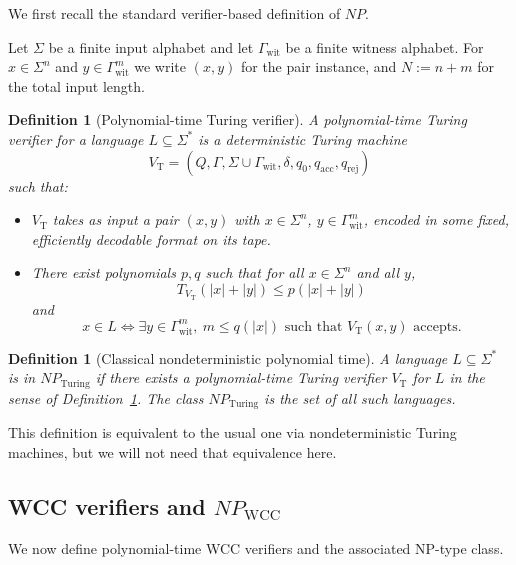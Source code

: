 \documentclass[12pt]{article}
\newtheorem{definition}[theorem]{Definition}
\begin{document}
We first recall the standard verifier-based definition of $NP$.

Let $\Sigma$ be a finite input alphabet and let $\Gamma_{\mathrm{wit}}$ be a
finite witness alphabet. For $x \in \Sigma^n$ and
$y \in \Gamma_{\mathrm{wit}}^{m}$ we write $(x,y)$ for the pair instance, and
$N := n + m$ for the total input length.

\begin{definition}[Polynomial-time Turing verifier]
\label{def:tm_verifier}
A \emph{polynomial-time Turing verifier} for a language $L \subseteq \Sigma^*$
is a deterministic Turing machine
\[
V_{\mathrm{T}} = (Q, \Gamma, \Sigma \cup \Gamma_{\mathrm{wit}}, \delta, q_0,
q_{\mathrm{acc}}, q_{\mathrm{rej}})
\]
such that:
\begin{itemize}
  \item $V_{\mathrm{T}}$ takes as input a pair $(x,y)$ with $x \in \Sigma^n$,
    $y \in \Gamma_{\mathrm{wit}}^{m}$, encoded in some fixed, efficiently
    decodable format on its tape.
  \item There exist polynomials $p,q$ such that for all $x \in \Sigma^n$ and
    all $y$,
    \[
    T_{V_{\mathrm{T}}}(|x|+|y|) \le p(|x|+|y|)
    \]
    and
    \[
    x \in L
    \iff
    \exists y \in \Gamma_{\mathrm{wit}}^{m},\ m \le q(|x|) \text{ such that }
    V_{\mathrm{T}}(x,y) \text{ accepts.}
    \]
\end{itemize}
\end{definition}

\begin{definition}[Classical nondeterministic polynomial time]
\label{def:npturing}
A language $L \subseteq \Sigma^*$ is in $NP_{\mathrm{Turing}}$ if there exists a
polynomial-time Turing verifier $V_{\mathrm{T}}$ for $L$ in the sense of
Definition~\ref{def:tm_verifier}. The class $NP_{\mathrm{Turing}}$ is the set of
all such languages.
\end{definition}

This definition is equivalent to the usual one via nondeterministic Turing
machines, but we will not need that equivalence here.

\subsection{WCC verifiers and $NP_{\mathrm{WCC}}$}

We now define polynomial-time WCC verifiers and the associated NP-type class.
\end{document}
